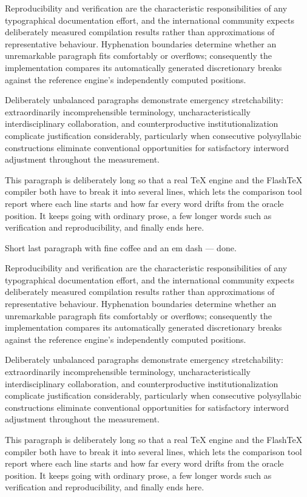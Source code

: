 \documentclass[12pt]{article}
\begin{document}
Reproducibility and verification are the characteristic responsibilities of any typographical documentation effort, and the international community expects deliberately measured compilation results rather than approximations of representative behaviour. Hyphenation boundaries determine whether an unremarkable paragraph fits comfortably or overflows; consequently the implementation compares its automatically generated discretionary breaks against the reference engine's independently computed positions.

Deliberately unbalanced paragraphs demonstrate emergency stretchability: extraordinarily incomprehensible terminology, uncharacteristically interdisciplinary collaboration, and counterproductive institutionalization complicate justification considerably, particularly when consecutive polysyllabic constructions eliminate conventional opportunities for satisfactory interword adjustment throughout the measurement.

This paragraph is deliberately long so that a real TeX engine and the FlashTeX compiler both have to break it into several lines, which lets the comparison tool report where each line starts and how far every word drifts from the oracle position. It keeps going with ordinary prose, a few longer words such as verification and reproducibility, and finally ends here.

Short last paragraph with fine coffee and an em dash --- done.

Reproducibility and verification are the characteristic responsibilities of any typographical documentation effort, and the international community expects deliberately measured compilation results rather than approximations of representative behaviour. Hyphenation boundaries determine whether an unremarkable paragraph fits comfortably or overflows; consequently the implementation compares its automatically generated discretionary breaks against the reference engine's independently computed positions.

Deliberately unbalanced paragraphs demonstrate emergency stretchability: extraordinarily incomprehensible terminology, uncharacteristically interdisciplinary collaboration, and counterproductive institutionalization complicate justification considerably, particularly when consecutive polysyllabic constructions eliminate conventional opportunities for satisfactory interword adjustment throughout the measurement.

This paragraph is deliberately long so that a real TeX engine and the FlashTeX compiler both have to break it into several lines, which lets the comparison tool report where each line starts and how far every word drifts from the oracle position. It keeps going with ordinary prose, a few longer words such as verification and reproducibility, and finally ends here.
\end{document}
